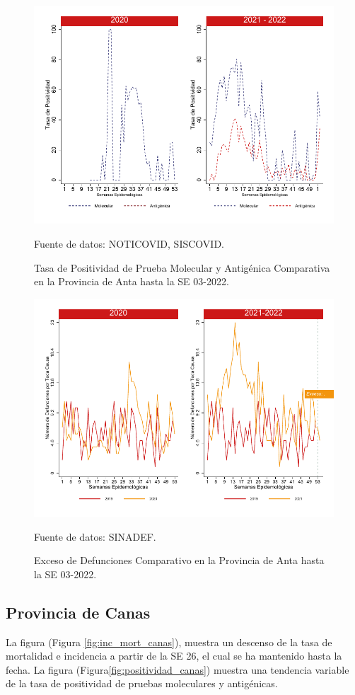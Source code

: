 \documentclass[12pt,a4paper,openany]{book}
\begin{document}
		\begin{figure}[h]
			\caption{Tasa de Positividad de Prueba Molecular y Antigénica Comparativa en la Provincia de Anta hasta la SE 03-2022.}\label{fig:positividad_anta}
			\begin{center}
				\includegraphics[width=0.7\linewidth]{../figuras/positividad_20_21_2}
			\end{center}
			{\footnotesize {Fuente de datos: NOTICOVID, SISCOVID.}}
		\end{figure}
		
		\begin{figure}[h]
			\caption{Exceso de Defunciones Comparativo en la Provincia de Anta hasta la SE 03-2022.}\label{fig:exceso_anta}
			\begin{center}
				\includegraphics[width=0.7\linewidth]{../figuras/exceso_2}
			\end{center}
			{\footnotesize {Fuente de datos: SINADEF.}}
		\end{figure}
		
		\clearpage
		
		\subsection*{Provincia de Canas}
		\noindent La figura (Figura \ref{fig:inc_mort_canas}),  muestra un descenso de la tasa de mortalidad e incidencia a partir de la SE 26, el cual se ha mantenido hasta la fecha. 
		\noindent La figura (Figura\ref{fig:positividad_canas}) muestra una tendencia variable de la tasa de positividad de pruebas moleculares y antigénicas.
		
\end{document}
